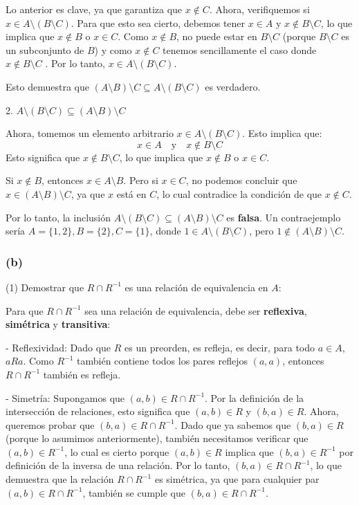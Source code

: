 \documentclass[12pt]{article}
\begin{document}
Lo anterior es clave, ya que garantiza que \(x \notin C\). Ahora, verifiquemos si \(x \in A \setminus (B \setminus C)\). Para que esto sea cierto, debemos tener \(x \in A\) y \(x \notin B \setminus C\), lo que implica que \(x \notin B\) o \(x \in C\). 
Como \(x \notin B\), no puede estar en \(B \setminus C\) (porque \(B \setminus C\) es un subconjunto de \(B\)) y como \(x \notin C\) tenemos sencillamente el caso donde \(x \notin B \setminus C\)
. Por lo tanto, \(x \in A \setminus (B \setminus C)\).

Esto demuestra que \((A \setminus B) \setminus C \subseteq A \setminus (B \setminus C)\) es verdadero.

2. \(A \setminus (B \setminus C) \subseteq (A \setminus B) \setminus C\)

Ahora, tomemos un elemento arbitrario \(x \in A \setminus (B \setminus C)\). Esto implica que:
\[
x \in A \quad \text{y} \quad x \notin B \setminus C
\]
Esto significa que \(x \notin B \setminus C\), lo que implica que \(x \notin B\) o \(x \in C\).

Si \(x \notin B\), entonces \(x \in A \setminus B\). Pero si \(x \in C\), no podemos concluir que \(x \in (A \setminus B) \setminus C\), ya que \(x\) está en \(C\), lo cual contradice la condición de que \(x \notin C\).

Por lo tanto, la inclusión \(A \setminus (B \setminus C) \subseteq (A \setminus B) \setminus C\) es \textbf{falsa}. 
Un contraejemplo sería \(A = \{1, 2\}, B = \{2\}, C = \{1\}\), donde \(1 \in A \setminus (B \setminus C)\), pero \(1 \notin (A \setminus B) \setminus C\).

\subsubsection*{(b)}

(1) Demostrar que \(R \cap R^{-1}\) es una relación de equivalencia en \(A\):

Para que \(R \cap R^{-1}\) sea una relación de equivalencia, debe ser \textbf{reflexiva}, \textbf{simétrica} y \textbf{transitiva}:

- Reflexividad: Dado que \(R\) es un preorden, es refleja, es decir, para todo \(a \in A\), \(a R a\). Como \(R^{-1}\) también contiene todos los pares reflejos \((a, a)\), entonces \(R \cap R^{-1}\) también es refleja.

- Simetría: Supongamos que \((a, b) \in R \cap R^{-1}\). Por la definición de la intersección de relaciones, esto significa que \((a, b) \in R\) y \((b, a) \in R\).  
Ahora, queremos probar que \((b, a) \in R \cap R^{-1}\). Dado que ya sabemos que \((b, a) \in R\) (porque lo asumimos anteriormente), también necesitamos verificar que \((a, b) \in R^{-1}\), lo cual es cierto porque \((a, b) \in R\) implica que \((b, a) \in R^{-1}\) por definición de la inversa de una relación.
Por lo tanto, \((b, a) \in R \cap R^{-1}\), lo que demuestra que la relación \(R \cap R^{-1}\) es simétrica, ya que para cualquier par \((a, b) \in R \cap R^{-1}\), también se cumple que \((b, a) \in R \cap R^{-1}\).
\end{document}
